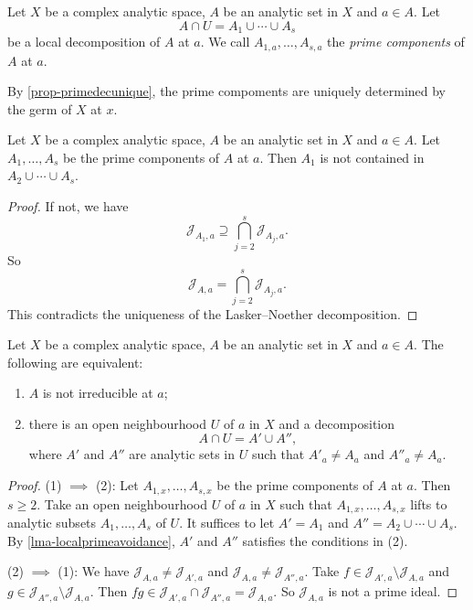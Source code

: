 \begin{definition}
    Let $X$ be a complex analytic space, $A$ be an analytic set in $X$ and $a\in A$. Let 
    \[
        A\cap U=A_1  \cup\cdots\cup A_s
    \] 
    be a local decomposition of $A$ at $a$. We call $A_{1,a},\ldots,A_{s,a}$ the \emph{prime components} of $A$ at $a$. 
\end{definition}
By \cref{prop-primedecunique}, the prime compoments are uniquely determined by the germ of $X$ at $x$.

\begin{lemma}\label{lma-localprimeavoidance}
    Let $X$ be a complex analytic space, $A$ be an analytic set in $X$ and $a\in A$. Let $A_1,\ldots,A_s$ be the prime components of $A$ at $a$. Then $A_1$ is not contained in $A_{2}\cup\cdots\cup A_s$.
\end{lemma}
\begin{proof}
    If not, we have 
    \[
        \mathcal{J}_{A_1,a}\supseteq  \bigcap_{j=2}^s \mathcal{J}_{A_j,a}.
    \]
    So
    \[
        \mathcal{J}_{A,a}=  \bigcap_{j=2}^s \mathcal{J}_{A_j,a}.
    \]
    This contradicts the uniqueness of the Lasker--Noether decomposition.
\end{proof}

\begin{proposition}
    Let $X$ be a complex analytic space, $A$ be an analytic set in $X$ and $a\in A$. The following are equivalent:
    \begin{enumerate}
        \item $A$ is not irreducible at $a$;
        \item there is an open neighbourhood $U$ of $a$ in $X$ and a decomposition
            \[
                A\cap U=A'\cup A'',    
            \]
            where $A'$ and $A''$ are analytic sets in $U$ such that $A'_a\neq A_a$ and $A''_a\neq A_a$.
    \end{enumerate}
\end{proposition}
\begin{proof}
    (1) $\implies$ (2): Let $A_{1,x},\ldots,A_{s,x}$ be the prime components of $A$ at $a$. Then $s\geq 2$.
    Take an open neighbourhood $U$ of $a$ in $X$ such that $A_{1,x},\ldots,A_{s,x}$ lifts to analytic subsets $A_1,\ldots,A_s$ of $U$. It suffices to let $A'=A_1$ and $A''=A_2\cup\cdots\cup A_s$. By \cref{lma-localprimeavoidance}, $A'$ and $A''$ satisfies the conditions in (2).

    (2) $\implies$ (1): We have $\mathcal{J}_{A,a}\neq \mathcal{J}_{A',a}$ and $\mathcal{J}_{A,a}\neq \mathcal{J}_{A'',a}$. Take $f\in \mathcal{J}_{A',a}\setminus \mathcal{J}_{A,a}$ and $g\in \mathcal{J}_{A'',a}\setminus \mathcal{J}_{A,a}$. Then $fg\in \mathcal{J}_{A',a}\cap \mathcal{J}_{A'',a}=\mathcal{J}_{A,a}$. So $\mathcal{J}_{A,a}$ is not a prime ideal.
\end{proof}

